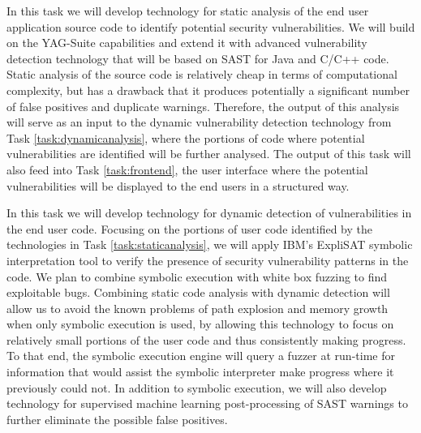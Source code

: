 \begin{Workpackage}{\thewpno}
\begin{Task}
\TaskResults{%
}
\TaskHeader{}
In this task we will develop technology for static analysis of the end user application source code to identify potential security vulnerabilities. We will build on the YAG-Suite capabilities and extend it with advanced vulnerability detection technology that will be based on SAST for Java and C/C++ code. Static analysis of the source code is relatively cheap in terms of computational complexity, but has a drawback that it produces potentially a significant number of false positives and duplicate warnings. Therefore, the output of this analysis will serve as an input to the dynamic vulnerability detection technology from Task \ref{task:dynamicanalysis}, where the portions of code where potential vulnerabilities are identified will be further analysed. The output of this task will also feed into Task \ref{task:frontend}, the user interface where the potential vulnerabilities will be displayed to the end users in a structured way.
\end{Task}

\begin{Task}
\TaskResults{%
}
\TaskHeader{}
In this task we will develop technology for dynamic detection of vulnerabilities in the end user code. Focusing on the portions of user code identified by the technologies in Task \ref{task:staticanalysis}, we will apply IBM's ExpliSAT symbolic interpretation tool to verify the presence of security vulnerability patterns in the code. We plan to combine symbolic execution with white box fuzzing to find exploitable bugs. Combining static code analysis with dynamic detection will allow us to avoid the known problems of path explosion and memory growth when only symbolic execution is used, by allowing this technology to focus on relatively small portions of the user code and thus consistently making progress. To that end, the symbolic execution engine will query a fuzzer at run-time for information that would assist the symbolic interpreter make progress where it previously could not. In addition to symbolic execution, we will also develop technology for supervised machine learning post-processing of SAST warnings to further eliminate the possible false positives. 
\end{Task}


\end{Workpackage}
